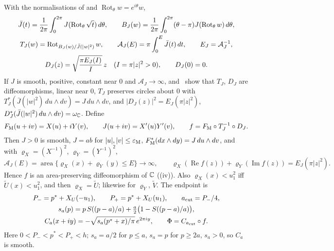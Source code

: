 With the normalisations of  and $\operatorname{Rot}_\theta w=e^{i\theta}w$,
\begin{gather}\label{eq:scalar-inner-normalisation}
 \bar J(t)=\frac1{2\pi}\int_0^{2\pi}J(\operatorname{Rot}_\theta\sqrt t)\,d\theta,\qquad
 B_J(w)=\frac1{2\pi}\int_0^{2\pi}(\theta-\pi)J(\operatorname{Rot}_\theta w)\,d\theta,\\
 T_J(w)=\operatorname{Rot}_{B_J(w)/\bar J(|w|^2)}w,\qquad
 \mathcal A_J(E)=\pi\int_0^E\bar J(t)\,dt,\qquad E_J=\mathcal A_J^{-1},\notag\\
 D_J(z)=\sqrt{\frac{\pi E_J(I)}{I}}\,z\quad(I=\pi|z|^2>0),\qquad D_J(0)=0.\notag
\end{gather}
If $J$ is smooth, positive, constant near $0$ and $\mathcal A_J\to\infty$,  and~ show that $T_J$, $D_J$ are diffeomorphisms, linear near $0$, $T_J$ preserves circles about $0$ with $T_J^*(\bar J(|w|^2)\,du\wedge dv)=J\,du\wedge dv$, and $|D_J(z)|^2=E_J(\pi|z|^2)$, $D_J^*(\bar J(|w|^2)\,du\wedge dv)=\omega_{\mathbb{C}}$. Define
\begin{equation}\label{eq:scalar-inner-map}
 F_{\rm M}(u+iv)=X(u)+iY(v),\qquad J(u+iv)=X'(u)Y'(v),\qquad
 f=F_{\rm M}\circ T_J^{-1}\circ D_J.
\end{equation}
Then $J>0$ is smooth, $J=ab$ for $|u|,|v|\le\varepsilon_{\rm M}$, $F_{\rm M}^*(dx\wedge dy)=J\,du\wedge dv$, and with $\varrho_X=(X^{-1})^2$, $\varrho_Y=(Y^{-1})^2$,
\begin{equation}\label{eq:scalar-level-area}
 \mathcal A_J(E)=\operatorname{area}\{\varrho_X(x)+\varrho_Y(y)\le E\}\longrightarrow\infty,\qquad
 \varrho_X(\operatorname{Re}f(z))+\varrho_Y(\operatorname{Im}f(z))=E_J(\pi|z|^2).
\end{equation}
Hence $f$ is an area-preserving diffeomorphism of $\mathbb{C}$ ((iv)). Also $\varrho_X(x)<u_1^2$ iff $\widetilde U(x)<u_1^2$, and then $\varrho_X=\widetilde U$; likewise for $\varrho_Y$, $\widetilde V$. The endpoint is
\begin{gather}\label{eq:scalar-endpoint}
 P_-=p^*+X_U(-u_1),\qquad P_+=p^*+X_U(u_1),\qquad a_{\rm cut}=P_-/4,\\
 s_a(p)=p\,S((p-a)/a)+\tfrac a2\bigl(1-S((p-a)/a)\bigr),\notag\\
 C_a(x+iy)=-\sqrt{s_a(p^*+x)/\pi}\,e^{2\pi iy},\qquad \Phi=C_{a_{\rm cut}}\circ f.\notag
\end{gather}
Here $0<P_-<p^*<P_+<h$; $s_a=a/2$ for $p\le a$, $s_a=p$ for $p\ge2a$, $s_a>0$, so $C_a$ is smooth.

